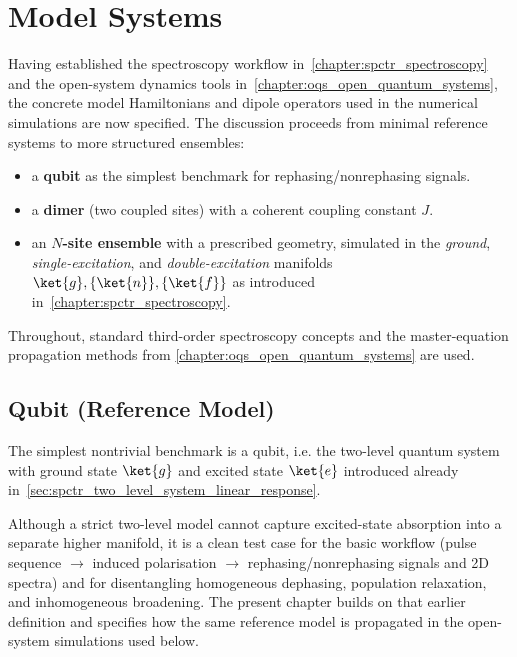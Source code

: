 \chapter{Model Systems}
\label{chapter:model_systems}

Having established the spectroscopy workflow in~\autoref{chapter:spctr_spectroscopy} and the open-system dynamics tools in~\autoref{chapter:oqs_open_quantum_systems}, the concrete model Hamiltonians and dipole operators used in the numerical simulations are now specified. The discussion proceeds from minimal reference systems to more structured ensembles:
\begin{itemize}
	\item a \textbf{qubit} as the simplest benchmark for rephasing/nonrephasing signals.
	\item a \textbf{dimer} (two coupled sites) with a coherent coupling constant $J$.
	\item an \textbf{$N$-site ensemble} with a prescribed geometry, simulated in the \emph{ground}, \emph{single-excitation}, and \emph{double-excitation} manifolds \,$\ket{g},\{\ket{n}\},\{\ket{f}\}$ as introduced in~\autoref{chapter:spctr_spectroscopy}.
\end{itemize}
Throughout, standard third-order spectroscopy concepts \cite{mukamel1995principlesnonlinearoptical,jonas2003twodimensionalfemtosecondspectroscopy,cho2009twodimensionalopticalspectroscopy} and the master-equation propagation methods from \autoref{chapter:oqs_open_quantum_systems} are used.


\section{Qubit (Reference Model)}
\label{sec:model_tls}

The simplest nontrivial benchmark is a qubit, i.e. the two-level quantum system with ground state $\ket{g}$ and excited state $\ket{e}$ introduced already in~\autoref{sec:spctr_two_level_system_linear_response}.

Although a strict two-level model cannot capture excited-state absorption into a separate higher manifold, it is a clean test case for the basic workflow (pulse sequence $\rightarrow$ induced polarisation $\rightarrow$ rephasing/nonrephasing signals and 2D spectra) and for disentangling homogeneous dephasing, population relaxation, and inhomogeneous broadening.
The present chapter builds on that earlier definition and specifies how the same reference model is propagated in the open-system simulations used below.


